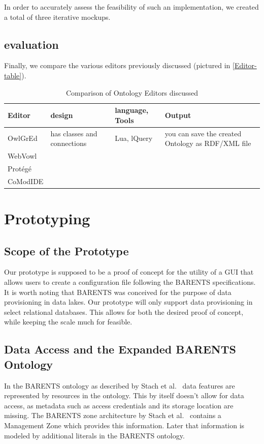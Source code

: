 \documentclass[sigconf]{acmart}
\begin{document}
            In order to accurately assess the feasibility of such an implementation, we created a total of three iterative mockups. 

    \subsection{evaluation}
        Finally, we compare the various editors previously discussed (pictured in \autoref{Editor-table}).

        \begin{table} [h]
            \centering
            \begin{tabulary} {\paperwidth} {p{1,5cm}|p{2,5cm}|p{1,3cm}|p{2,5cm}}
                Editor & design & language, Tools & Output \\ \hline
                OwlGrEd & has classes and connections & Lua, lQuery & you can save the created Ontology as RDF/XML file \\ \hline
                WebVowl & & & \\ \hline
                Protégé & & & \\ \hline
                CoModIDE & & & \\ \hline
            \end{tabulary}
            \caption{Comparison of Ontology Editors discussed}
            \label{Editor-table}
        \end{table}


\section{Prototyping}
    \subsection{Scope of the Prototype}
        Our prototype is supposed to be a proof of concept for the utility of a GUI that allows users to create a configuration file following the BARENTS specifications. 
        It is worth noting that BARENTS was conceived for the purpose of data provisioning in data lakes.
        Our prototype will only support data provisioning in select relational databases. 
        This allows for both the desired proof of concept, while keeping the scale much for feasible.

    \subsection{Data Access and the Expanded BARENTS Ontology}
        In the BARENTS ontology as described by Stach et al.~\cite{barents21} data features are represented by resources in the ontology.
        This by itself doesn't allow for data access, as metadata such as access credentials and its storage location are missing.  
        The BARENTS zone architecture by Stach et al.~\cite{barents21} contains a Management Zone which provides this information. 
        Later that information is modeled by additional literals in the BARENTS ontology.
\end{document}
